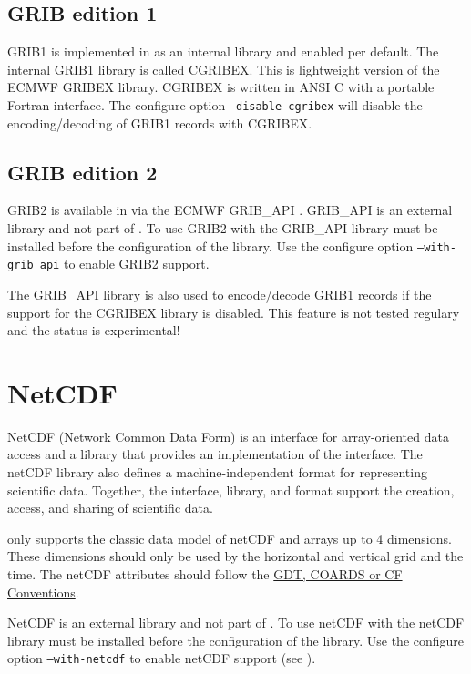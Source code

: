 \subsection{GRIB edition 1}

GRIB1 is implemented in {\CDI} as an internal library and enabled per default.
The internal GRIB1 library is called CGRIBEX. This is lightweight
version of the ECMWF GRIBEX library. CGRIBEX is written in ANSI C with a portable Fortran interface. 
The configure option {\tt --disable-cgribex} will disable the encoding/decoding of GRIB1 records with CGRIBEX.

\subsection{GRIB edition 2}

GRIB2 is available in {\CDI} via the ECMWF GRIB\_API \cite{GRIBAPI}.
GRIB\_API is an external library and not part of {\CDI}. To use GRIB2 with
{\CDI} the GRIB\_API library must be installed before the configuration
of the {\CDI} library. Use the configure option {\tt --with-grib\_api} to
enable GRIB2 support. 

The GRIB\_API library is also used to encode/decode GRIB1 records if the support for the CGRIBEX library is disabled.
This feature is not tested regulary and the status is experimental!

\section{NetCDF}

NetCDF \cite{NetCDF} (Network Common Data Form) is an interface for array-oriented data
access and a library that provides an implementation of the interface.
The netCDF library also defines a machine-independent format for 
representing scientific data. Together, the interface, library, and 
format support the creation, access, and sharing of scientific data.

{\CDI} only supports the classic data model of netCDF and arrays up to 4 dimensions.
These dimensions should only be used by the horizontal and vertical grid and the time.
The netCDF attributes should follow the
\href{http://ftp.unidata.ucar.edu/software/netcdf/docs/conventions.html}
     {GDT, COARDS or CF Conventions}.

NetCDF is an external library and not part of {\CDI}. To use netCDF with
{\CDI} the netCDF library must be installed before the configuration
of the {\CDI} library. Use the configure option {\tt --with-netcdf} to
enable netCDF support (see ).

